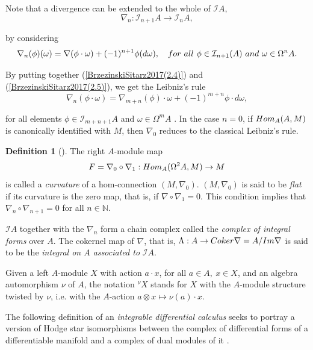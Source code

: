 \documentclass{amsart}
\theoremstyle{definition}
\newtheorem{definition}[theorem]{Definition}
\theoremstyle{remark}
\numberwithin{equation}{section}
\begin{document}
Note that a divergence can be extended to the whole of $\mathcal{I}A$, 
\[
\nabla_n: \mathcal{I}_{n+1} A \to \mathcal{I}_{n} A,
\]

by considering
\begin{equation}\label{BrzezinskiSitarz2017(2.5)}
\nabla_n(\phi)(\omega) = \nabla(\phi \cdot \omega) + (-1)^{n+1} \phi(d \omega), \quad {\rm for\ all}\ \phi \in \mathcal{I}_{n+1}(A)\ {\rm and} \ \omega \in \Omega^n A.
\end{equation}

By putting together (\ref{BrzezinskiSitarz2017(2.4)}) and (\ref{BrzezinskiSitarz2017(2.5)}), we get the Leibniz's rule 
\begin{equation}
    \nabla_n(\phi \cdot \omega) = \nabla_{m + n}(\phi) \cdot \omega + (-1)^{m + n} \phi \cdot d\omega,
\end{equation}

for all elements $\phi \in \mathcal{I}_{m + n + 1} A$ and $\omega \in \Omega^m A$ \cite[Lemma 3.2]{Brzezinski2008}. In the case $n = 0$, if ${\rm Hom}_A(A, M)$ is canonically identified with $M$, then $\nabla_0$ reduces to the classical Leibniz's rule.

\begin{definition}[{\cite[Definition 3.4]{Brzezinski2008}}]
The right $A$-module map 
$$
F = \nabla_0 \circ \nabla_1: {\rm Hom}_A(\Omega^{2} A, M) \to M
$$ is called a {\em curvature} of a hom-connection $(M, \nabla_0)$. $(M, \nabla_0)$ is said to be {\em flat} if its curvature is the zero map, that is, if $\nabla \circ \nabla_1 = 0$. This condition implies that $\nabla_n \circ \nabla_{n+1} = 0$ for all $n\in \mathbb{N}$.
\end{definition}

$\mathcal{I} A$ together with the $\nabla_n$ form a chain complex called the {\em complex of integral forms} over $A$. The cokernel map of $\nabla$, that is, $\Lambda: A \to {\rm Coker} \nabla = A / {\rm Im} \nabla$ is said to be the {\em integral on $A$ associated to} $\mathcal{I}A$.

Given a left $A$-module $X$ with action $a\cdot x$, for all $a\in A,\ x \in X$, and an algebra automorphism $\nu$ of $A$, the notation $^{\nu}X$ stands for $X$ with the $A$-module structure twisted by $\nu$, i.e. with the $A$-action $a\otimes x \mapsto \nu(a)\cdot x $.

The following definition of an \textit{integrable differential calculus} seeks to portray a version of Hodge star isomorphisms between the complex of differential forms of a differentiable manifold and a complex of dual modules of it \cite[p. 112]{Brzezinski2015}. %
\end{document}

